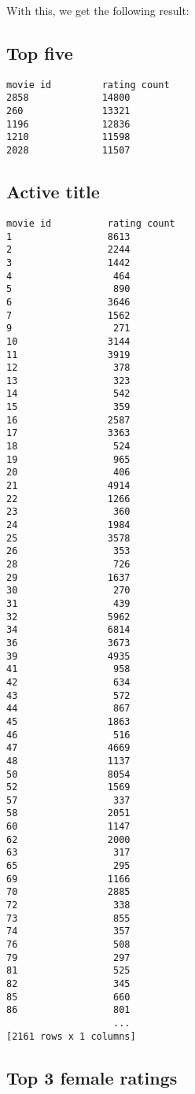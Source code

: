 \documentclass{article}
\begin{document}
With this, we get the following result:

\subsection{Top five} 
     
\begin{verbatim}
movie id 		 rating count
2858             14800
260              13321
1196             12836
1210             11598
2028             11507
\end{verbatim}

\subsection{Active title}

\begin{verbatim}
movie id  		  rating count            
1                 8613
2                 2244
3                 1442
4                  464
5                  890
6                 3646
7                 1562
9                  271
10                3144
11                3919
12                 378
13                 323
14                 542
15                 359
16                2587
17                3363
18                 524
19                 965
20                 406
21                4914
22                1266
23                 360
24                1984
25                3578
26                 353
28                 726
29                1637
30                 270
31                 439
32                5962
34                6814
36                3673
39                4935
41                 958
42                 634
43                 572
44                 867
45                1863
46                 516
47                4669
48                1137
50                8054
52                1569
57                 337
58                2051
60                1147
62                2000
63                 317
65                 295
69                1166
70                2885
72                 338
73                 855
74                 357
76                 508
79                 297
81                 525
82                 345
85                 660
86                 801
                   ...
[2161 rows x 1 columns]
\end{verbatim}

\subsection{Top 3 female ratings}
\end{document}
